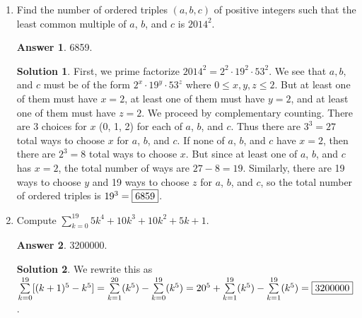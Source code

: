 \documentclass[11pt]{article}
\theoremstyle{definition}
\newtheorem*{solution}{Solution}
\newtheorem*{answer}{Answer}
\begin{document}
\begin{enumerate}
\item %
Find the number of ordered triples $(a, b, c)$ of positive integers such that the least common multiple of $a$, $b$, and $c$ is $2014^2$.

\begin{answer}
6859.
\end{answer}
\begin{solution}
 First, we prime factorize $2014^2 = 2^2 \cdot 19^2 \cdot 53^2$. We see that $a, b,$ and $c$ must be of the form $2^x \cdot 19^y \cdot 53^z$ where $0 \leq x, y, z \leq 2$. But at least one of them must have $x = 2$, at least one of them must have $y = 2$, and at least one of them must have $z = 2$. We proceed by complementary counting. There are $3$ choices for $x$ (0, 1, 2) for each of $a$, $b$, and $c$. Thus there are $3^3 = 27$ total ways to choose $x$ for $a$, $b$, and $c$. If none of $a$, $b$, and $c$ have $x = 2$, then there are $2^3 = 8$ total ways to choose $x$. But since at least one of $a$, $b$, and $c$ has $x = 2$, the total number of ways are $27 - 8 = 19$. Similarly, there are 19 ways to choose $y$ and 19 ways to choose $z$ for $a$, $b$, and $c$, so the total number of ordered triples is $19^3 = \framebox{6859}$.
\end{solution}

\item %
Compute $\sum\limits_{k=0}^{19}{5k^4 + 10k^3 + 10k^2 + 5k + 1}$.

\begin{answer}
3200000.
\end{answer}
\begin{solution}
 We rewrite this as $\sum\limits_{k=0}^{19}[(k+1)^5 - k^5] = \sum\limits_{k=1}^{20} (k^5) - \sum\limits_{k=0}^{19} (k^5) = 20^5 + \sum\limits_{k=1}^{19} (k^5) - \sum\limits_{k=1}^{19} (k^5) = \framebox{3200000}$.
\end{solution}

\end{enumerate}
\end{document}
